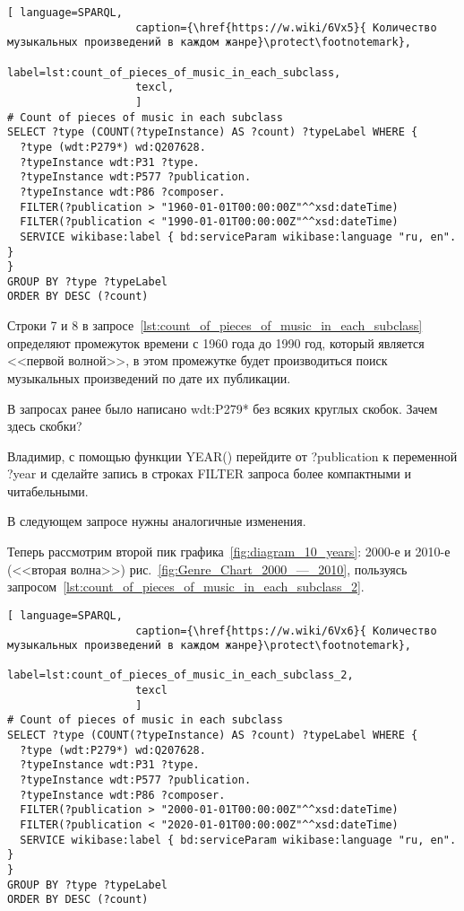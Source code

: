 \begin{lstlisting}[ language=SPARQL,
                    caption={\href{https://w.wiki/6Vx5}{ Количество музыкальных произведений в каждом жанре}\protect\footnotemark},
                    label=lst:count_of_pieces_of_music_in_each_subclass,
                    texcl,
                    ]
# Count of pieces of music in each subclass
SELECT ?type (COUNT(?typeInstance) AS ?count) ?typeLabel WHERE {
  ?type (wdt:P279*) wd:Q207628.
  ?typeInstance wdt:P31 ?type.
  ?typeInstance wdt:P577 ?publication.
  ?typeInstance wdt:P86 ?composer.
  FILTER(?publication > "1960-01-01T00:00:00Z"^^xsd:dateTime)        
  FILTER(?publication < "1990-01-01T00:00:00Z"^^xsd:dateTime)
  SERVICE wikibase:label { bd:serviceParam wikibase:language "ru, en". }
}
GROUP BY ?type ?typeLabel
ORDER BY DESC (?count)
\end{lstlisting}%

Строки 7 и 8 в запросе~\ref{lst:count_of_pieces_of_music_in_each_subclass} определяют промежуток времени с 1960 года до 1990 год, который является <<первой волной>>, в этом промежутке будет производиться поиск музыкальных произведений по дате их публикации.

\TODO В запросах ранее было написано wdt:P279* без всяких круглых скобок. Зачем здесь скобки?

\TODO Владимир, с помощью функции YEAR() перейдите от ?publication к переменной ?year 
и сделайте запись в строках FILTER запроса более компактными и читабельными. 

\TODO В следующем запросе нужны аналогичные изменения. 



Теперь рассмотрим второй пик графика~\ref{fig:diagram_10_years}: 2000-е и 2010-е (<<вторая волна>>) рис.~\ref{fig:Genre_Chart_2000_—_2010}, пользуясь запросом~\ref{lst:count_of_pieces_of_music_in_each_subclass_2}.

\begin{lstlisting}[ language=SPARQL,
                    caption={\href{https://w.wiki/6Vx6}{ Количество музыкальных произведений в каждом жанре}\protect\footnotemark},
                    label=lst:count_of_pieces_of_music_in_each_subclass_2,
                    texcl 
                    ]
# Count of pieces of music in each subclass
SELECT ?type (COUNT(?typeInstance) AS ?count) ?typeLabel WHERE {
  ?type (wdt:P279*) wd:Q207628.
  ?typeInstance wdt:P31 ?type.
  ?typeInstance wdt:P577 ?publication.
  ?typeInstance wdt:P86 ?composer.
  FILTER(?publication > "2000-01-01T00:00:00Z"^^xsd:dateTime)        
  FILTER(?publication < "2020-01-01T00:00:00Z"^^xsd:dateTime)
  SERVICE wikibase:label { bd:serviceParam wikibase:language "ru, en". }
}
GROUP BY ?type ?typeLabel
ORDER BY DESC (?count)
\end{lstlisting}%

